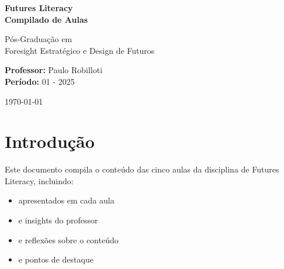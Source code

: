 \begin{titlepage}
    \centering
    \vspace*{2cm}
    
    {\Huge\bfseries\sffamily\color{primary_espm}
    Futures Literacy\\[0.5cm]
    \large Compilado de Aulas}
    
    \vspace{1.5cm}
    
    {\Large\sffamily\color{darkgray}
    Pós-Graduação em\\ Foresight Estratégico e Design de Futuros}
    
    \vspace{2cm}
    
    
    \vspace{2cm}
    
    {\large\sffamily

    \textbf{Professor:} Paulo Robilloti\\[0.5cm]
    \textbf{Período:} 01 - 2025}
    
    \vfill
    
    {\large\sffamily\color{darkgray}
    \today}
    
\end{titlepage}

\tableofcontents
\newpage

\section*{Introdução}

Este documento compila o conteúdo das cinco aulas da disciplina de Futures Literacy, incluindo:

\begin{itemize}[leftmargin=*]
    \item {} apresentados em cada aula
    \item {} e insights do professor
    \item {} e reflexões sobre o conteúdo
    \item {} e pontos de destaque
\end{itemize}

\sectionbreak
